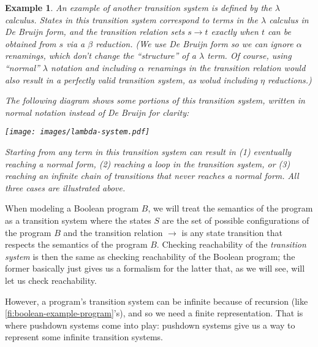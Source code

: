 \documentclass{article}
\newtheorem{example}{Example}
\begin{document}
\begin{example}
An example of another transition system is defined by the $\lambda$
calculus. States in this transition system correspond to terms in the
$\lambda$ calculus in De Bruijn form, and the transition relation sets
$s \rightarrow t$ exactly when $t$ can be obtained from $s$ via a
$\beta$ reduction. (We use De Bruijn form so we can ignore $\alpha$
renamings, which don't change the ``structure'' of a $\lambda$ term. Of
course, using ``normal'' $\lambda$ notation and including $\alpha$
renamings in the transition relation would also result in a perfectly
valid transition system, as wolud including $\eta$ reductions.)

The following diagram shows some portions of this transition system,
written in normal notation instead of De Bruijn for clarity:\\
\begin{center}
  \texttt{[image: images/lambda-system.pdf]}
\end{center}

Starting from any term in this transition system can result in (1)
eventually reaching a normal form, (2) reaching a loop in the
transition system, or (3) reaching an infinite chain of transitions
that never reaches a normal form. All three cases are illustrated
above.
\end{example}

When modeling a Boolean program $B$, we will treat the semantics of
the program as a transition system where the states $S$ are the set of
possible configurations of the program $B$ and the transition relation
$\rightarrow$ is any state transition that respects the semantics of
the program $B$. Checking reachability of the \emph{transition system}
is then the same as checking reachability of the Boolean program; the
former basically just gives us a formalism for the latter that, as we
will see, will let us check reachability.

However, a program's transition system can be infinite because of
recursion (like \cref{fi:boolean-example-program}'s\footnotemark), and
so we need a finite representation. That is where pushdown systems
come into play: pushdown systems give us a way to represent some
infinite transition systems.

\end{document}
